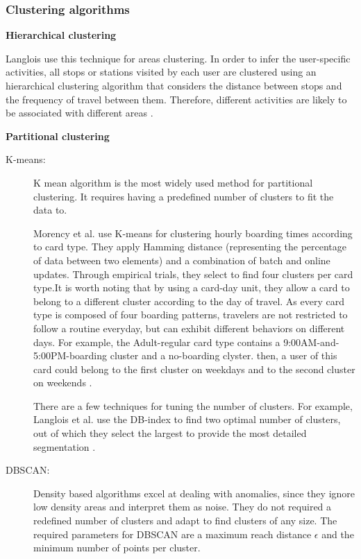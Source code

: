 \documentclass{article}
\begin{document}
\subsubsection{Clustering algorithms} 

\textbf{Hierarchical clustering}

Langlois use this technique for areas clustering. In order to infer the user-specific activities, all stops or stations visited by each user are clustered using an hierarchical clustering algorithm that considers the distance between stops and the frequency of travel between them. Therefore, different activities are likely to be associated with different areas \cite{langlois2016inferring}.

\textbf{Partitional clustering}

\begin{description}
\item[K-means:]
K mean algorithm is the most widely used method for partitional clustering. It requires having a predefined number of clusters to fit the data to. 

Morency et al. use K-means for clustering hourly boarding times according to card type. They apply Hamming distance (representing the percentage of data between two elements) and a combination of batch and online updates. Through empirical trials, they select to find four clusters per card type.It is worth noting that by using a card-day unit, they allow a card to belong to a different cluster according to the day of travel. As every card type is composed of four boarding patterns, travelers are not restricted to follow a routine everyday, but can exhibit different behaviors on different days. For example, the Adult-regular card type contains a 9:00AM-and-5:00PM-boarding cluster and a no-boarding clyster. then, a user of this card could belong to the first cluster on weekdays and to the second cluster on weekends \cite{morency2007measuring}. 

There are a few techniques for tuning the number of clusters. For example, Langlois et al. use the DB-index to find two optimal number of clusters, out of which they select the largest to provide the most detailed segmentation \cite{langlois2016inferring}. 


\item[DBSCAN:]
Density based algorithms excel at dealing with anomalies, since they ignore low density areas and interpret them as noise. They do not required a redefined number of clusters and adapt to find clusters of any size. The required parameters for DBSCAN are a maximum reach distance $\epsilon$ and the minimum number of points per cluster.


\end{description}
\end{document}
